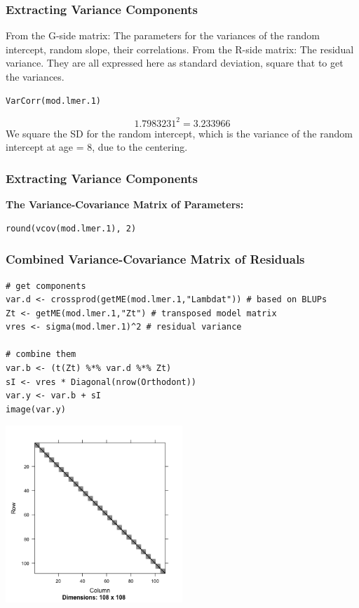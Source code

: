 \documentclass{beamer}
\begin{document}
\begin{frame}[fragile]
    \frametitle{Extracting Variance Components}
    From the G-side matrix: The parameters for the variances of the random intercept, random slope, their correlations.
    From the R-side matrix: The residual variance. They are all expressed here as standard deviation, square that to get the variances.
    \begin{Verbatim}[frame=single]
VarCorr(mod.lmer.1)
    \end{Verbatim}
    \scalebox{0.8}{
        
    }
    \begin{equation*}
        1.7983231^2 = 3.233966
    \end{equation*}
    We square the SD for the random intercept, which is the variance of the random intercept at age = 8, due to the centering.
\end{frame}

\begin{frame}[fragile]
    \frametitle{Extracting Variance Components}
    \textbf{The Variance-Covariance Matrix of Parameters:}
    \vspace{0.5cm}
    
    \begin{Verbatim}[frame=single]
round(vcov(mod.lmer.1), 2)
    \end{Verbatim}
    \tiny\scalebox{1}{
        
    }
\end{frame}

\begin{frame}[fragile]
    \frametitle{Combined Variance-Covariance Matrix of Residuals}
    \tiny\begin{Verbatim}[frame=single]
# get components
var.d <- crossprod(getME(mod.lmer.1,"Lambdat")) # based on BLUPs
Zt <- getME(mod.lmer.1,"Zt") # transposed model matrix
vres <- sigma(mod.lmer.1)^2 # residual variance

# combine them
var.b <- (t(Zt) %*% var.d %*% Zt)
sI <- vres * Diagonal(nrow(Orthodont))
var.y <- var.b + sI
image(var.y)
    \end{Verbatim}

    \begin{center}
        \includegraphics[width=0.5\textwidth]{lectures/day_6_praxis_and_fitting_of_mems/figures/unnamed-chunk-19-1.png}
    \end{center}
\end{frame}
\end{document}
